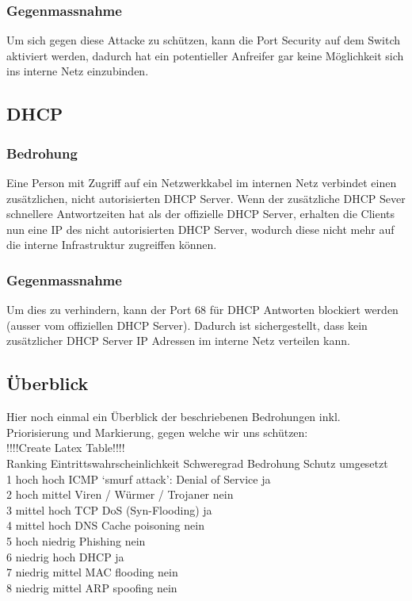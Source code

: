 \documentclass[11pt,a4paper,parskip=half]{scrartcl}
\begin{document}
\subsubsection{Gegenmassnahme}
Um sich gegen diese Attacke zu schützen, kann die Port Security auf dem Switch aktiviert werden, dadurch hat ein potentieller Anfreifer gar keine Möglichkeit sich ins interne Netz einzubinden.

\subsection{DHCP}
\subsubsection{Bedrohung}
Eine Person mit Zugriff auf ein Netzwerkkabel im internen Netz verbindet einen zusätzlichen, nicht autorisierten DHCP Server. Wenn der zusätzliche DHCP Sever schnellere Antwortzeiten hat als der offizielle DHCP Server, erhalten die Clients nun eine IP des nicht autorisierten DHCP Server, wodurch diese nicht mehr auf die interne Infrastruktur zugreiffen können.
\subsubsection{Gegenmassnahme}
Um dies zu verhindern, kann der Port 68 für DHCP Antworten blockiert werden (ausser vom offiziellen DHCP Server). Dadurch ist sichergestellt, dass kein zusätzlicher DHCP Server IP Adressen im interne Netz verteilen kann.

\subsection{Überblick}
Hier noch einmal ein Überblick der beschriebenen Bedrohungen inkl. Priorisierung und Markierung, gegen welche wir uns schützen:\\
!!!!Create Latex Table!!!!\\
Ranking	Eintrittswahrscheinlichkeit		Schweregrad		Bedrohung					Schutz umgesetzt\\
1		hoch					hoch			ICMP ‘smurf attack’: Denial of Service	ja\\
2		hoch					mittel			Viren / Würmer / Trojaner			nein\\
3		mittel					hoch			TCP DoS (Syn-Flooding)			ja\\
4		mittel					hoch			DNS Cache poisoning			nein\\
5		hoch					niedrig		Phishing					nein\\
6		niedrig				hoch			DHCP						ja\\
7		niedrig				mittel			MAC flooding					nein\\
8		niedrig				mittel			ARP spoofing				nein\\
\end{document}
